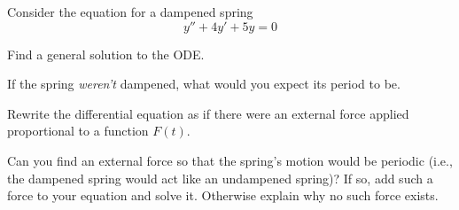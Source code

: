 \documentclass{workbook}
\begin{document}
\begin{slide}
	\question
	Consider the equation for a dampened spring
	\[
		y'' + 4y' + 5y=0
	\]
	\begin{parts}
		\item Find a general solution to the ODE.
		\item If the spring \emph{weren't} dampened, what would you expect its period to be.
		\item Rewrite the differential equation as if there were an external force applied proportional to a function $F(t)$.
		\item Can you find an external force so that the spring's motion would be periodic (i.e., the dampened spring would act like an undampened spring)? If so, add such a force to your equation and solve it. Otherwise explain why no such force exists.
	\end{parts}

\end{slide}
\end{document}
